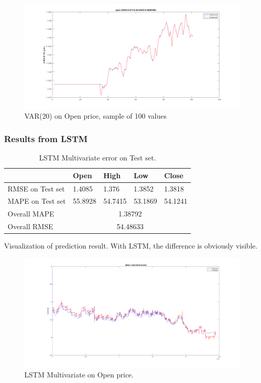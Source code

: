 \documentclass[11pt]{article}
\begin{document}
\begin{figure}[H]
  \centering
  \includegraphics[width=\textwidth,keepaspectratio]{figs/var20open100.png}
  \caption{VAR(20) on Open price, sample of 100 values}
\end{figure}


\subsubsection{Results from LSTM}

\begin{table}[H]
  \centering
\begin{tabular}{|l|l|l|l|l|}
  \hline
                   & Open        & High       & Low        & Close      \\ \hline
  RMSE on Test set & 1.4085      & 1.376      & 1.3852     & 1.3818     \\ \hline
  MAPE on Test set & 55.8928     & 54.7415    & 53.1869    & 54.1241    \\ \hline
  Overall MAPE     & \multicolumn{4}{c|}{1.38792}         \\ \hline
  Overall RMSE     & \multicolumn{4}{c|}{54.48633}        \\ \hline
\end{tabular}
\caption{LSTM Multivariate error on Test set.}
\end{table}

Visualization of prediction result. With LSTM, the difference is obviously visible.

\begin{figure}[H]
  \centering
  \includegraphics[width=\textwidth,keepaspectratio]{figs/lstm_multi_open.png}
  \caption{LSTM Multivariate on Open price.}
\end{figure}
\end{document}
